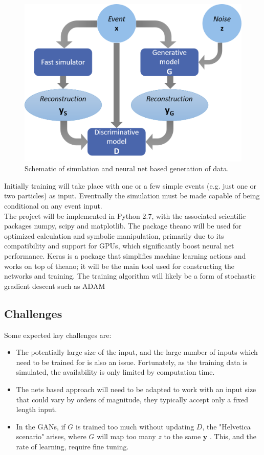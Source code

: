 \documentclass{article}
\begin{document}
\begin{figure}[H]
	\centering
	\includegraphics[width=0.6\linewidth]{img/mldiag}
	
	\caption{Schematic of simulation and neural net based generation of data.}
	\label{fig:mldiag}
	
\end{figure}


Initially training will take place with one or a few simple events (e.g. just one or two particles) as input. Eventually the simulation must be made capable of being conditional on any event input.\\

The project will be implemented in Python 2.7, with the associated scientific packages numpy, scipy and matplotlib. The package theano \cite{theano} will be used for optimized calculation and symbolic manipulation, primarily due to its compatibility and support for GPUs, which significantly boost neural net performance. Keras \cite{keras} is a package that simplifies machine learning actions and works on top of theano; it will be the main tool used for constructing the networks and training. The training algorithm will likely be a form of stochastic gradient descent such as ADAM \cite{adam}\\

\subsection{Challenges}

Some expected key challenges are:
\begin{itemize}
	\item The potentially large size of the input, and the large number of inputs which need to be trained for is also an issue. Fortunately, as the training data is simulated, the availability is only limited by computation time. 
	\item The nets based approach will need to be adapted to work with an input size that could vary by orders of magnitude, they typically accept only a fixed length input. 
	\item In the GANs, if $G$ is trained too much without updating $D$, the "Helvetica scenario" arises, where $G$ will map too many $z$ to the same $\mathbf{y}$ \cite{gan1}. This, and the rate of learning, require fine tuning. 
\end{itemize}
\end{document}
